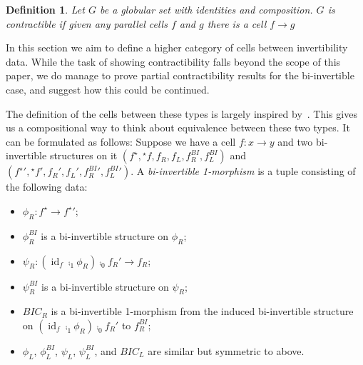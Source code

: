 \documentclass[draft]{article}
\newtheorem{definition}[theorem]{Definition} \theoremstyle{remark}
\DeclareMathOperator{\id}{id}
\newcommand{\linv}[1]{{}^\star\!#1} \newcommand{\rinv}[1]{#1^\star}
\begin{document}
\begin{definition}
  Let \(G\) be a globular set with identities and composition. \(G\)
  is \emph{contractible} if given any parallel cells \(f\) and \(g\)
  there is a cell \(f \to g\)
\end{definition}

In this section we aim to define a higher category of cells between
invertibility data. While the task of showing contractibility falls
beyond the scope of this paper, we do manage to prove partial
contractibility results for the bi-invertible case, and suggest how
this could be continued.

The definition of the cells between these types is largely inspired
by~\cite[Lemma 4.2.5]{hottbook}. This gives us a compositional way to
think about equivalence between these two types. It can be formulated
as follows: Suppose we have a cell \(f : x \to y\) and two
bi-invertible structures on it \((\rinv f, \linv f, f_R, f_L,
f_R^{BI}, f_L^{BI})\) and \((\rinv f{}' , \linv f{}', f_R', f_L',
f_R^{BI}{}', f_L^{BI}{}')\). A \emph{bi-invertible 1-morphism} is a tuple
consisting of the following data:
\begin{itemize}
\item \(\phi_R : \rinv f \to \rinv f{}'\);
\item \(\phi_R^{BI}\) is a bi-invertible structure on \(\phi_R\);
\item \(\psi_R : (\id_f \comp_1 \phi_R) \comp_0 f_R' \to f_R\);
\item \(\psi_R^{BI}\) is a bi-invertible structure on \(\psi_R\);
\item \(BIC_R\) is a bi-invertible 1-morphism from the induced bi-invertible structure on
  \((\id_f \comp_1 \phi_R) \comp_0 f_R'\) to \(f_R^{BI}\);
\item \(\phi_L\), \(\phi_L^{BI}\), \(\psi_L\), \(\psi_L^{BI}\), and
  \(BIC_L\) are similar but symmetric to above.
\end{itemize}
\end{document}
